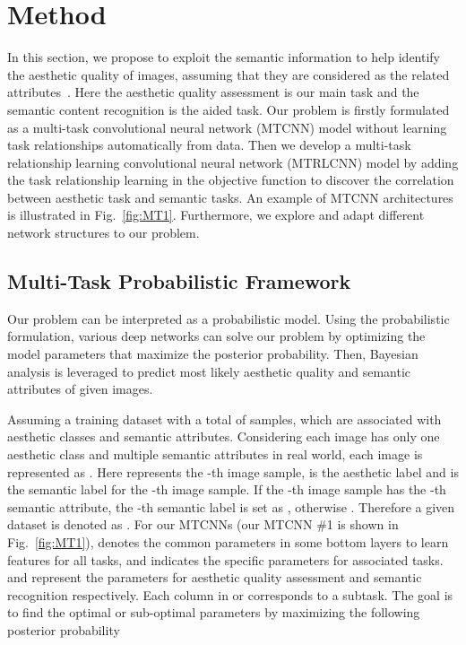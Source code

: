 \documentclass[journal]{IEEEtran}
\begin{document}
\section{Method \label{sec:method}}
In this section, we propose to exploit the semantic information to help identify the aesthetic quality of images, assuming that they are considered as the related attributes~\cite{mullin2015there,locher2015aesthetic}. Here the aesthetic quality assessment is our main task and the semantic content recognition is the aided task. Our problem is firstly formulated as a multi-task convolutional neural network (MTCNN) model without learning task relationships automatically from data. Then we develop a multi-task relationship learning convolutional neural network (MTRLCNN) model by adding the task relationship learning in the objective function to discover the correlation between aesthetic task and semantic tasks. An example of MTCNN architectures is illustrated in Fig.~\ref{fig:MT1}. Furthermore, we explore and adapt different network structures to our problem.

\subsection{Multi-Task Probabilistic Framework \label{sec:MTPF}}
Our problem can be interpreted as a probabilistic model. Using the probabilistic formulation, various deep networks can solve our problem by optimizing the model parameters that maximize the posterior probability. Then, Bayesian analysis is leveraged to predict most likely aesthetic quality and semantic attributes of given images.

Assuming a training dataset with a total of  samples, which are associated with  aesthetic classes and  semantic attributes. Considering each image has only one aesthetic class and multiple semantic attributes in real world, each image is represented as . Here  represents the -th image sample,  is the aesthetic label and  is the semantic label for the -th image sample. If the -th image sample has the -th semantic attribute, the -th semantic label is set as , otherwise . Therefore a given dataset is denoted as . For our MTCNNs (our MTCNN \#1 is shown in Fig.~\ref{fig:MT1}),  denotes the common parameters in some bottom layers to learn features for all tasks, and  indicates the specific parameters for associated tasks.  and  represent the parameters for aesthetic quality assessment and semantic recognition respectively. Each column in  or  corresponds to a subtask. The goal is to find the optimal or sub-optimal parameters  by maximizing the following posterior probability
\end{document}
